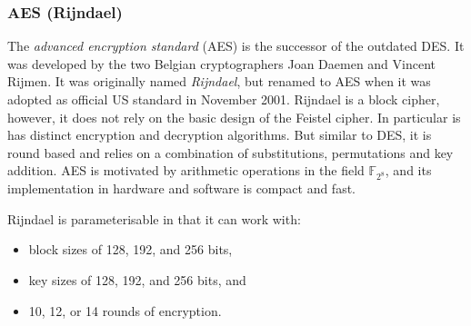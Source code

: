 \newcommand{\R}{\mathbb{R}}
\newcommand{\Z}{\mathbb{Z}}
\newcommand{\N}{\mathbb{N}}
\newcommand{\Q}{\mathbb{Q}}
\newcommand{\F}{\mathbb{F}}
\newcommand{\rcl}[2]{{{[#1]}_{#2}}}
\newcommand{\modulo}[3]{#1\equiv #3(\bmod\, #2)}
\newcommand\inv[1]{{{#1}^{-1}}}
\newcommand\ftwox{{ \F_2[x]}}
\newcommand\ftwoxpx{{ \F_2[x]/p(x)}}
\newcommand\ftwoeight{{ \F_{2^8}}}
\newcommand\cto{\longrightarrow}
\newcommand\EA{\mathbf{E_A}}
\newcommand\EB{\mathbf{E_B}}
\newcommand\EK{\mathbf{E_K}}
\newcommand\EM{\mathbf{E_M}}

\newcommand\Zpstar{{ \Z_p^*}}
\newcommand\Znstar{{ \Z_n^*}}
\newcommand\xor{{\oplus}}
\newcommand{\set}[1]{\{#1\}}


\def\EXN{3}
\def\DATE{\Week\EXN}


\ifText \NoHead {}



\subsubsection{AES (Rijndael)}

  The \emph{advanced encryption
  standard} (AES) is the successor of the outdated DES. It was developed by the
two Belgian cryptographers Joan Daemen and Vincent Rijmen. It was originally
named \emph{Rijndael}, but renamed to AES when it was adopted as official US
standard in November 2001. Rijndael is a block cipher, however, it does not rely
on the basic design of the Feistel cipher. In particular is has distinct
encryption and decryption algorithms. But similar to DES, it is round based and
relies on a combination of substitutions, permutations and key addition. AES is
motivated by arithmetic operations in the field $\F_{2^8}$, and its
implementation in hardware and software is compact and fast.

Rijndael is parameterisable in that it can work with:
\begin{itemize}
\item block sizes of 128, 192, and 256 bits,
\item key sizes of 128, 192, and 256 bits, and
\item 10, 12, or 14 rounds of encryption.
\end{itemize}

